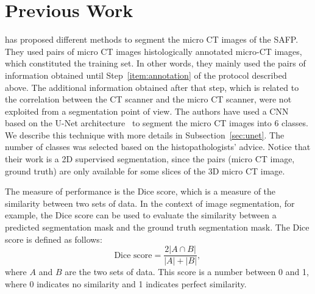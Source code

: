 \tocless\section{Previous Work}
\cite{gangloff2020probabilistic} has proposed different methods to segment the
micro CT images of the SAFP. They used pairs of micro CT images
histologically annotated micro-CT images, which constituted the training set. 
In other words, they mainly used the pairs of information obtained until 
Step~\ref{item:annotation} of the protocol described above.
The additional information
obtained after that step, which is related to the correlation between the CT scanner
and the micro CT scanner,  were not exploited from a segmentation point of view.
The authors have used a CNN based on the U-Net architecture~\citep{ronneberger2015u}
to segment the micro CT images into 6 classes.
We describe this technique with more details in 
Subsection~\ref{sec:unet}.
The number of classes was selected based on the histopathologists' advice.
Notice that their work is a 2D supervised segmentation, 
since the pairs (micro CT image, ground truth) are only available for some slices
of the 3D micro CT image.


The measure of performance is the Dice score, which is a measure of the similarity
between two sets of data. In the context of image segmentation,
for example, the Dice score can be used to evaluate the similarity between a
predicted segmentation mask and the ground truth segmentation mask.
The Dice score is defined as follows:
\begin{equation}
    \label{eq:dice_score}
    \text{Dice score} = \frac{2|A \cap B|}{|A| + |B|} \text{, }
\end{equation}
where $A$ and $B$ are the two sets of data.
This score is a number between 0 and 1, where 0 indicates no similarity and 1
indicates perfect similarity.


